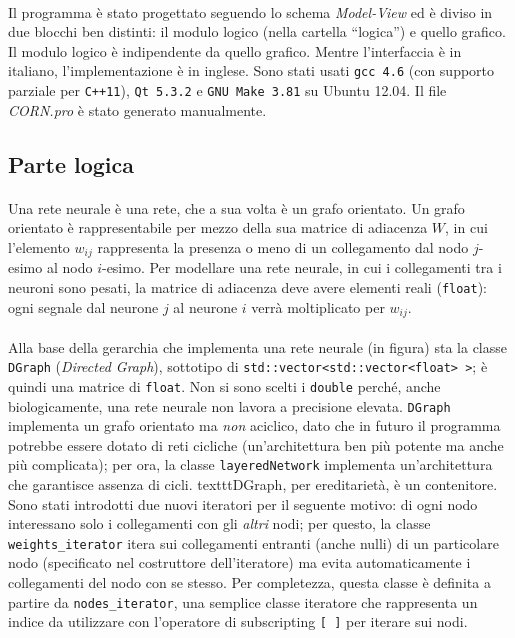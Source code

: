 \documentclass{article}
\begin{document}
\paragraph{} Il programma è stato progettato seguendo lo schema \textit{Model-View} ed è diviso in due blocchi ben distinti: il modulo logico (nella cartella “logica”) e quello grafico. Il modulo logico è indipendente da quello grafico. Mentre l'interfaccia è in italiano, l'implementazione è in inglese. Sono stati usati \texttt{gcc 4.6} (con supporto parziale per \texttt{C++11}), \texttt{Qt 5.3.2} e \texttt{GNU Make 3.81} su Ubuntu 12.04. Il file \emph{CORN.pro} è stato generato manualmente.

\subsection{Parte logica}

\paragraph{} Una rete neurale è una rete, che a sua volta è un grafo orientato. Un grafo orientato è rappresentabile per mezzo della sua matrice di adiacenza $W$, in cui l'elemento $w_{ij}$ rappresenta la presenza o meno di un collegamento dal nodo $j$-esimo al nodo $i$-esimo. Per modellare una rete neurale, in cui i collegamenti tra i neuroni sono pesati, la matrice di adiacenza deve avere elementi reali (\texttt{float}): ogni segnale dal neurone $j$ al neurone $i$ verrà moltiplicato per $w_{ij}$.

\paragraph{} Alla base della gerarchia che implementa una rete neurale (in figura) sta la classe \texttt{DGraph} (\emph{Directed Graph}), sottotipo di \texttt{std::vector<std::vector<float> >}; è quindi una matrice di \texttt{float}. Non si sono scelti i \texttt{double} perché, anche biologicamente, una rete neurale non lavora a precisione elevata. \texttt{DGraph} implementa un grafo orientato ma \emph{non} aciclico, dato che in futuro il programma potrebbe essere dotato di reti cicliche (un'architettura ben più potente ma anche più complicata); per ora, la classe \texttt{layeredNetwork} implementa un'architettura che garantisce assenza di cicli. texttt{DGraph}, per ereditarietà, è un contenitore. Sono stati introdotti due nuovi iteratori per il seguente motivo: di ogni nodo interessano solo i collegamenti con gli \emph{altri} nodi; per questo, la classe \texttt{weights\_iterator} itera sui collegamenti entranti (anche nulli) di un particolare nodo (specificato nel costruttore dell'iteratore) ma evita automaticamente i collegamenti del nodo con se stesso. Per completezza, questa classe è definita a partire da \texttt{nodes\_iterator}, una semplice classe iteratore che rappresenta un indice da utilizzare con l'operatore di subscripting \texttt{[ ]} per iterare sui nodi.
\end{document}
